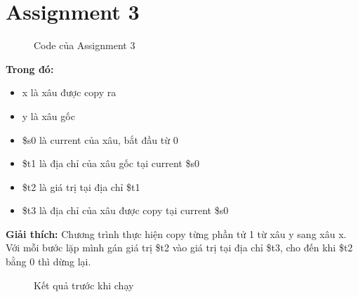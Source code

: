 \documentclass[a4paper,12pt]{article}
\begin{document}
\section{Assignment 3}
\begin{figure}[!h]
	\centerline{}
	\caption{Code của Assignment 3}
	\label{fig:ass3}
\end{figure}
\noindent
\textbf{Trong đó: }
\begin{itemize}
	\item x là xâu được copy ra
	\item y là xâu gốc
	\item \$s0 là current của xâu, bắt đầu từ 0
	\item \$t1 là địa chỉ của xâu gốc tại current \$s0
	\item \$t2 là giá trị tại địa chỉ \$t1
	\item \$t3 là địa chỉ của xâu được copy tại current \$s0
\end{itemize}
\newpage
\noindent
\textbf{Giải thích: }Chương trình thực hiện copy từng phần tử 1 từ xâu y sang xâu x. Với mỗi bước lặp mình gán giá trị \$t2 vào giá trị tại địa chỉ \$t3, cho đến khi \$t2 bằng 0 thì dừng lại.
\begin{figure}[!h]
	\centerline{}
	\caption{Kết quả trước khi chạy}
	\label{fig:ass3_r1}
\end{figure}
\end{document}
